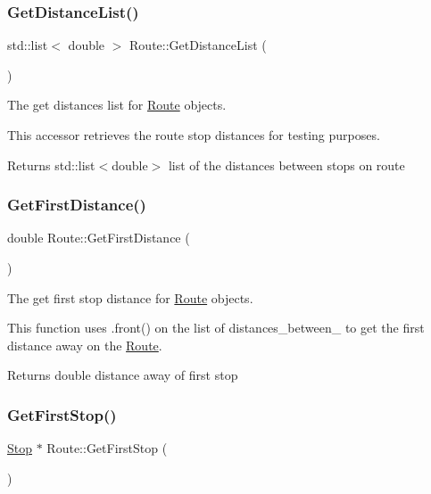 \subsubsection{\texorpdfstring{Get\+Distance\+List()}{GetDistanceList()}}
{\footnotesize\ttfamily std\+::list$<$ double $>$ Route\+::\+Get\+Distance\+List (\begin{DoxyParamCaption}{ }\end{DoxyParamCaption})}



The get distances list for \hyperlink{classRoute}{Route} objects. 

This accessor retrieves the route stop distances for testing purposes.

\begin{DoxyReturn}{Returns}
std\+::list$<$double$>$ list of the distances between stops on route 
\end{DoxyReturn}
\mbox{\label{classRoute_a352a82a718bfdec044b114abe332c29f}} 
\subsubsection{\texorpdfstring{Get\+First\+Distance()}{GetFirstDistance()}}
{\footnotesize\ttfamily double Route\+::\+Get\+First\+Distance (\begin{DoxyParamCaption}{ }\end{DoxyParamCaption})}



The get first stop distance for \hyperlink{classRoute}{Route} objects. 

This function uses .front() on the list of distances\+\_\+between\+\_\+ to get the first distance away on the \hyperlink{classRoute}{Route}.

\begin{DoxyReturn}{Returns}
double distance away of first stop 
\end{DoxyReturn}
\mbox{\label{classRoute_aa70ac0596b72df43514f6e3a81552d38}} 
\subsubsection{\texorpdfstring{Get\+First\+Stop()}{GetFirstStop()}}
{\footnotesize\ttfamily \hyperlink{classStop}{Stop} $\ast$ Route\+::\+Get\+First\+Stop (\begin{DoxyParamCaption}{ }\end{DoxyParamCaption})}



